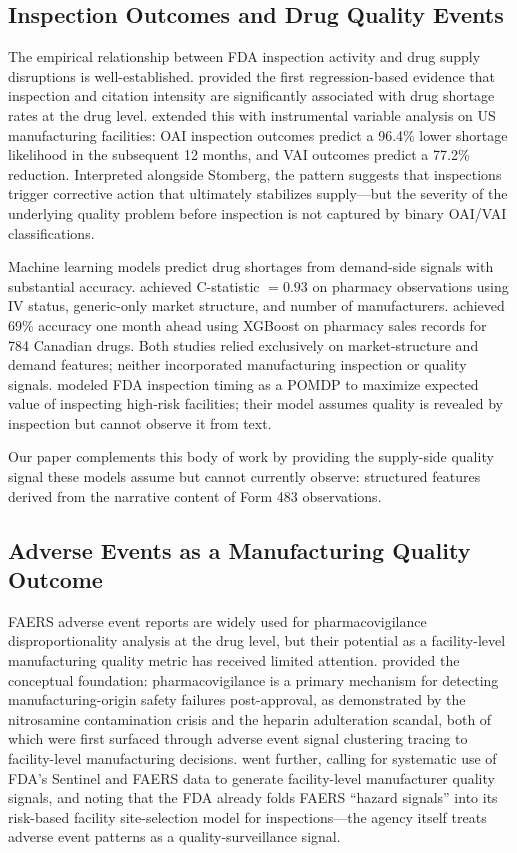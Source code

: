 \subsection{Inspection Outcomes and Drug Quality Events}

The empirical relationship between FDA inspection activity and drug supply
disruptions is well-established.
\citet{Stomberg2018} provided the first regression-based evidence that
inspection and citation intensity are significantly associated with drug
shortage rates at the drug level.
\citet{Wang2025MSOM} extended this with instrumental variable analysis on US
manufacturing facilities: OAI inspection outcomes predict a 96.4\% lower
shortage likelihood in the subsequent 12 months, and VAI outcomes predict a
77.2\% reduction.
Interpreted alongside Stomberg, the pattern suggests that inspections trigger
corrective action that ultimately stabilizes supply---but the severity of the
underlying quality problem before inspection is not captured by binary OAI/VAI
classifications.

Machine learning models predict drug shortages from demand-side signals with
substantial accuracy.
\citet{Liu2021} achieved C-statistic $= 0.93$ on pharmacy observations using IV
status, generic-only market structure, and number of manufacturers.
\citet{Pall2023} achieved 69\% accuracy one month ahead using XGBoost on
pharmacy sales records for 784 Canadian drugs.
Both studies relied exclusively on market-structure and demand features; neither
incorporated manufacturing inspection or quality signals.
\citet{Kosmas2023} modeled FDA inspection timing as a POMDP to maximize
expected value of inspecting high-risk facilities; their model assumes quality
is revealed by inspection but cannot observe it from text.

Our paper complements this body of work by providing the supply-side quality
signal these models assume but cannot currently observe: structured features
derived from the narrative content of Form 483 observations.

\subsection{Adverse Events as a Manufacturing Quality Outcome}

FAERS adverse event reports are widely used for pharmacovigilance
disproportionality analysis at the drug level, but their potential as a
facility-level manufacturing quality metric has received limited attention.
\citet{Sardella2021} provided the conceptual foundation: pharmacovigilance is a
primary mechanism for detecting manufacturing-origin safety failures
post-approval, as demonstrated by the nitrosamine contamination crisis and the
heparin adulteration scandal, both of which were first surfaced through adverse
event signal clustering tracing to facility-level manufacturing decisions.
\citet{Brown2020} went further, calling for systematic use of FDA's Sentinel
and FAERS data to generate facility-level manufacturer quality signals, and
noting that the FDA already folds FAERS ``hazard signals'' into its risk-based
facility site-selection model for inspections---the agency itself treats
adverse event patterns as a quality-surveillance signal.

